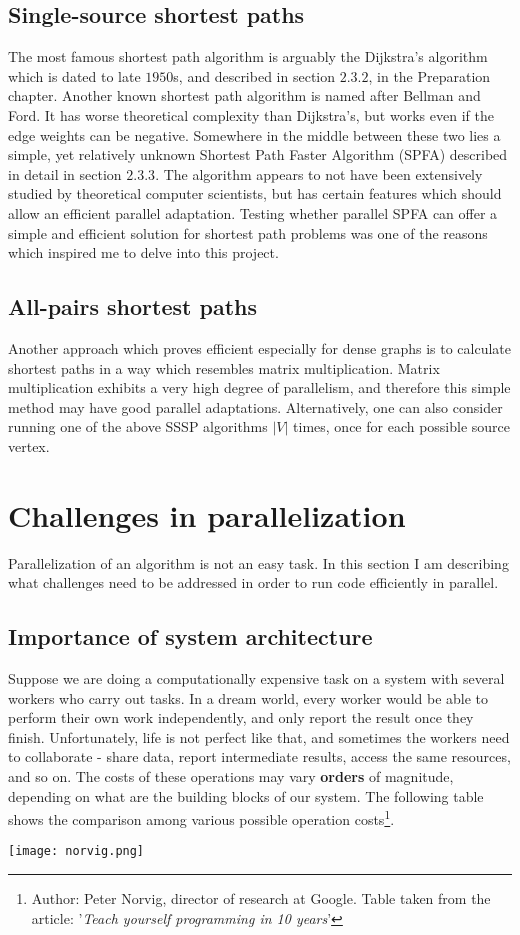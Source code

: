 \documentclass[12pt,a4paper,twoside,openright]{report}
\begin{document}
\subsection{Single-source shortest paths}
The most famous shortest path algorithm is arguably the Dijkstra's algorithm which is dated to late $1950$s, and described in section $2.3.2$, in the Preparation chapter. Another known shortest path algorithm is named after Bellman and Ford. It has worse theoretical complexity than Dijkstra's, but works even if the edge weights can be negative. Somewhere in the middle between these two lies a simple, yet relatively unknown Shortest Path Faster Algorithm (SPFA) described in detail in section $2.3.3$. The algorithm appears to not have been extensively studied by theoretical computer scientists, but has certain features which should allow an efficient parallel adaptation. Testing whether parallel SPFA can offer a simple and efficient solution for shortest path problems was one of the reasons which inspired me to delve into this project.

\subsection{All-pairs shortest paths}
Another approach which proves efficient especially for dense graphs is to calculate shortest paths in a way which resembles matrix multiplication. Matrix multiplication exhibits a very high degree of parallelism, and therefore this simple method may have good parallel adaptations. Alternatively, one can also consider running one of the above SSSP algorithms $|V|$ times, once for each possible source vertex.

\section{Challenges in parallelization}
Parallelization of an algorithm is not an easy task. In this section I am describing what challenges need to be addressed in order to run code efficiently in parallel.

\subsection{Importance of system architecture} 
Suppose we are doing a computationally expensive task on a system with several workers who carry out tasks. In a dream world, every worker would be able to perform their own work independently, and only report the result once they finish. Unfortunately, life is not perfect like that, and sometimes the workers need to collaborate - share data, report intermediate results, access the same resources, and so on. The costs of these operations may vary \textbf{orders} of magnitude, depending on what are the building blocks of our system. The following table shows the comparison among various possible operation costs\footnote{Author: Peter Norvig, director of research at Google. Table taken from the article: '\textit{Teach yourself programming in 10 years}'}.
\begin{center}
\texttt{[image: norvig.png]}
\end{center}
\end{document}
